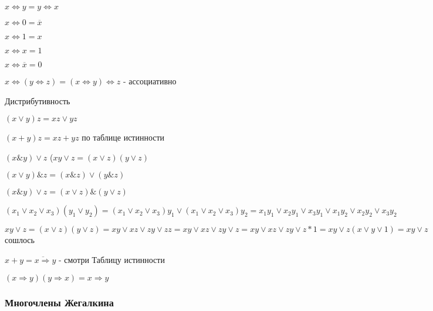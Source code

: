 \documentclass[russian]{lecture-notes}
\begin{document}
\begin{sloppypar}
\begin{proposition}
            $x \Leftrightarrow y = y \Leftrightarrow x$

            $x \Leftrightarrow 0 = \overline{x}$

            $x \Leftrightarrow 1 = x$

            $x \Leftrightarrow x =1$

            $x \Leftrightarrow \overline{x} = 0$

            $x \Leftrightarrow (y\Leftrightarrow z) = (x \Leftrightarrow y) \Leftrightarrow z$ - ассоциативно

        \end{proposition}

        \begin{proposition}

            Дистрибутивность

            $(x \lor y) z = xz \lor yz$

            $(x+y)z = xz + yz$ по таблице истинности

            $(x \& y ) \lor z$ ($xy \lor z = (x \lor z)(y \lor z)$

            $(x \lor y) \& z = (x \& z) \lor (y \& z)$

            $(x \& y) \lor z = (x \lor z) \& (y\lor z)$

            \begin{remark}

                $ $
                $(x_{1} \lor x_{2} \lor x_{3}) (y_{1} \lor y_{2}) = (x_{1} \lor x_{2} \lor x_{3})y_{1} \lor (x_{1} \lor x_{2} \lor x_{3})y_{2} = x_{1}y_{1} \lor x_{2}y_{1} \lor x_{3}y_{1} \lor x_{1}y_{2} \lor x_{2}y_{2} \lor x_{3}y_{2}$

                $xy \lor z = (x \lor z)(y\lor z) = xy \lor xz \lor zy \lor zz = xy \lor  xz \lor zy \lor z = xy \lor xz \lor zy \lor z*1 = xy \lor z(x\lor y \lor 1) = xy \lor z$ сошлось

            \end{remark}

            $x+y = \overline{x\Rightarrow}y$ - смотри Таблицу истинности

            $(x\Rightarrow y)(y\Rightarrow x) = x \Rightarrow y$

            \subsubsection{Многочлены Жегалкина}

            \begin{remark}


\end{remark}
\end{proposition}
\end{sloppypar}
\end{document}
